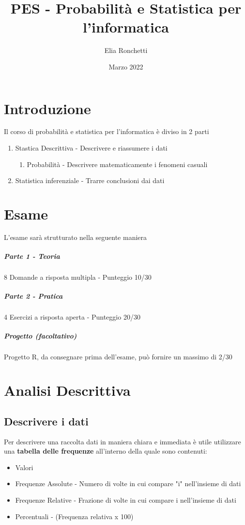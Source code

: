 \documentclass[12pt, a4paper, openany]{book}
\begin{document}
\title{PES - Probabilità e Statistica per l'informatica}
\author{Elia Ronchetti}
\date{Marzo 2022}

\maketitle
\tableofcontents

\chapter{Introduzione}
Il corso di probabilità e statistica per l'informatica è diviso in 2 parti
\begin{enumerate}
    \item Stastica Descrittiva - Descrivere e riassumere i dati
    \begin{enumerate}
        \item Probabilità - Descrivere matematicamente i fenomeni casuali
    \end{enumerate}
    \item Statistica inferenziale - Trarre conclusioni dai dati
\end{enumerate}

\chapter{Esame}
L'esame sarà strutturato nella seguente maniera
\paragraph{Parte 1 - Teoria}
8 Domande a risposta multipla - Punteggio 10/30
\paragraph{Parte 2 - Pratica}
4 Esercizi a risposta aperta - Punteggio 20/30
\paragraph{Progetto (facoltativo)}
Progetto R, da consegnare prima dell'esame, può fornire un massimo di 2/30

\chapter{Analisi Descrittiva}
\section{Descrivere i dati}
Per descrivere una raccolta dati in maniera chiara e immediata è utile utilizzare una \textbf{tabella delle frequenze}
all'interno della quale sono contenuti:
\begin{itemize}
    \item Valori
    \item Frequenze Assolute - Numero di volte in cui compare "i" nell'insieme di dati
    \item Frequenze Relative - Frazione di volte in cui compare i nell'insieme di dati
    \item Percentuali - (Frequenza relativa x 100)
\end{itemize}
\end{document}
